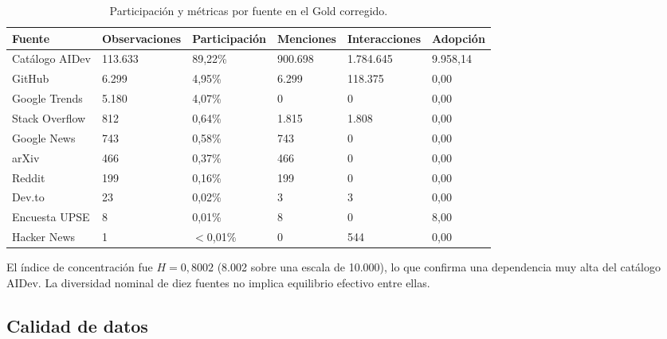 \documentclass[12pt,a4paper]{article}
\begin{document}
\begin{table}[H]
\centering
\small
{}
\begin{tabularx}{\textwidth}{P{3.2cm} P{2.2cm} P{2.1cm} P{2.3cm} P{2.3cm} Y}
\toprule
{}
\textbf{Fuente} & \textbf{Observaciones} & \textbf{Participación} & \textbf{Menciones} & \textbf{Interacciones} & \textbf{Adopción} \\
\midrule
Catálogo AIDev & 113.633 & 89,22\% & 900.698 & 1.784.645 & 9.958,14 \\
GitHub & 6.299 & 4,95\% & 6.299 & 118.375 & 0,00 \\
Google Trends & 5.180 & 4,07\% & 0 & 0 & 0,00 \\
Stack Overflow & 812 & 0,64\% & 1.815 & 1.808 & 0,00 \\
Google News & 743 & 0,58\% & 743 & 0 & 0,00 \\
arXiv & 466 & 0,37\% & 466 & 0 & 0,00 \\
Reddit & 199 & 0,16\% & 199 & 0 & 0,00 \\
Dev.to & 23 & 0,02\% & 3 & 3 & 0,00 \\
Encuesta UPSE & 8 & 0,01\% & 8 & 0 & 8,00 \\
Hacker News & 1 & $<$0,01\% & 0 & 544 & 0,00 \\
\bottomrule
\end{tabularx}
\caption{Participación y métricas por fuente en el Gold corregido.}
\label{tab:participacion}
\end{table}

El índice de concentración fue $H=0,8002$ (8.002 sobre una escala de 10.000), lo que confirma una dependencia muy alta del catálogo AIDev. La diversidad nominal de diez fuentes no implica equilibrio efectivo entre ellas.

\subsection{Calidad de datos}
\end{document}
